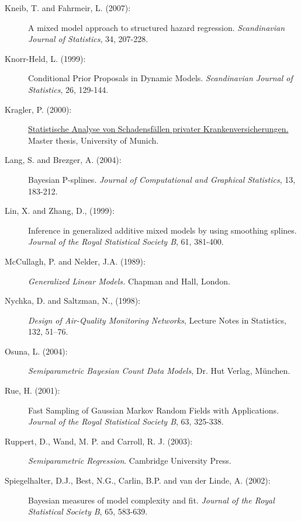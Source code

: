 \documentclass[11pt,a4paper,twoside]{bayesxarticle}
\begin{document}
\begin{description}
\item[Kneib, T. and Fahrmeir, L. (2007):] A mixed model approach
to structured hazard regression. {\em Scandinavian Journal of
Statistics}, 34, 207-228.

\item[Knorr-Held, L. (1999):] Conditional Prior Proposals in
Dynamic Models. {\em Scandinavian Journal of Statistics}, 26,
129-144.

\item[Kragler, P. (2000):] \href{http://www.scor.fr/us/2_laureat.asp?pays=2}
{Statistische Analyse von Schadensf\"allen privater
Krankenversicherungen.} Master thesis, University of Munich.

\item[Lang, S. and Brezger, A. (2004):] Bayesian P-splines. {\it
Journal of Computational and Graphical Statistics}, 13, 183-212.

\item[Lin, X. and Zhang, D., (1999):]
Inference in generalized additive mixed models by using smoothing
splines. {\it Journal of the Royal Statistical Society B}, 61,
381-400.

\item[McCullagh, P. and Nelder, J.A. (1989):] {\em Generalized Linear Models.} Chapman and Hall, London.

\item[Nychka, D. and Saltzman, N., (1998):]
{\it Design of Air-Quality Monitoring Networks},
Lecture Notes in Statistics, 132, 51--76.

\item[Osuna, L. (2004):] {\it Semiparametric Bayesian Count Data
Models}, Dr. Hut Verlag, M\"{u}nchen.

\item[Rue, H. (2001):] Fast Sampling of Gaussian Markov Random Fields with Applications.
{\em Journal of the Royal Statistical Society B}, 63, 325-338.

\item[Ruppert, D., Wand, M. P. and Carroll, R. J. (2003):] {\em Semiparametric Regression}.
Cambridge University Press.

\item[Spiegelhalter, D.J., Best, N.G., Carlin, B.P. and van der Linde, A. (2002):]
Bayesian measures of model complexity and fit. {\em Journal of the
Royal Statistical Society B}, 65, 583-639.

\end{description}


\hypertarget{index}{}
\end{document}
